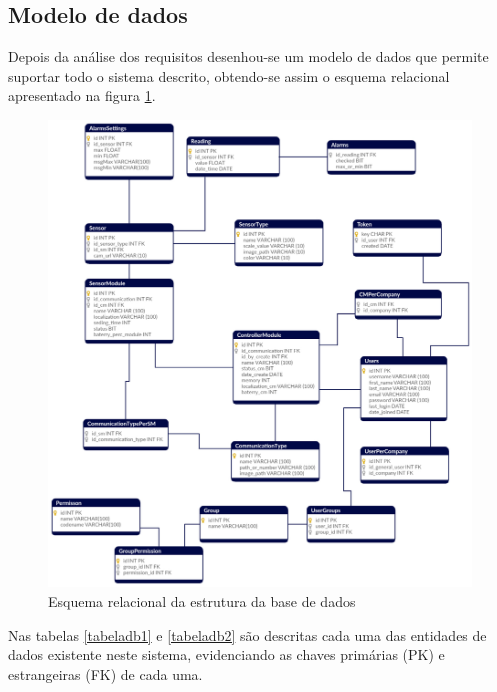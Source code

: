 \newpage
\subsection{Modelo de dados}
\label{modelocap}

Depois da análise dos requisitos desenhou-se um modelo de dados que permite suportar todo o sistema descrito, obtendo-se assim o esquema relacional apresentado na figura \ref{esquemarelacional}.





\begin{figure}[!htb]
	\centering
	\includegraphics[width=\linewidth]{esquemas/database_tese.pdf}
	\caption{Esquema relacional da estrutura da base de dados}
	\label{esquemarelacional}
\end{figure}


Nas tabelas \ref{tabeladb1} e \ref{tabeladb2} são descritas cada uma das entidades de dados existente neste sistema, evidenciando as chaves primárias (\ac{PK}) e estrangeiras (\ac{FK}) de cada uma. 



